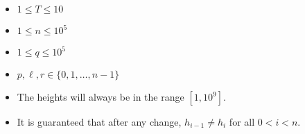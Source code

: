 \begin{itemize}
\item $1\le T \le 10$
\item $1\le n \le 10^5$
\item $1\le q \le 10^5$
\item $p, \ell, r \in \{0,1,\ldots,n-1\}$
\item The heights will always be in the range $[1,10^9]$.
\item It is guaranteed that after any change, $h_{i-1}\neq h_i$ for all $0<i<n$. 
\end{itemize}
